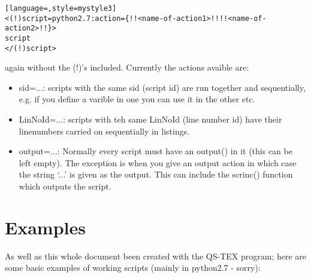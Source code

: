 \documentclass[a4paper,12pt,twocolum]{article}
\begin{document}

\begin{lstlisting}[language=,style=mystyle3]
<(!)script=python2.7:action={!!<name-of-action1>!!!!<name-of-action2>!!}>
script
</(!)script>
\end{lstlisting}
          
again without the (!)'s included. Currently the actions avaible are:
\begin{itemize}
\item sid=...: scripts with the same sid (script id) are run together and sequentially, e.g. if you define a varible in one you can use it in the other etc.
\item LinNoId=...: scripts with teh same LinNoId (line number id) have their linenumbers carried on sequentially in listings.
\item output=...: Normally every script must have an output() in it (this can be left empty). The exception is when you give an output action in which case the string `...' is given as the output. This can include the scrinc() function which outputs the script.
\end{itemize}
\section{Examples}
As well as this whole document been created with the QS-TEX program; here are some basic examples of working scripts (mainly in python2.7 - sorry):

\end{document}
